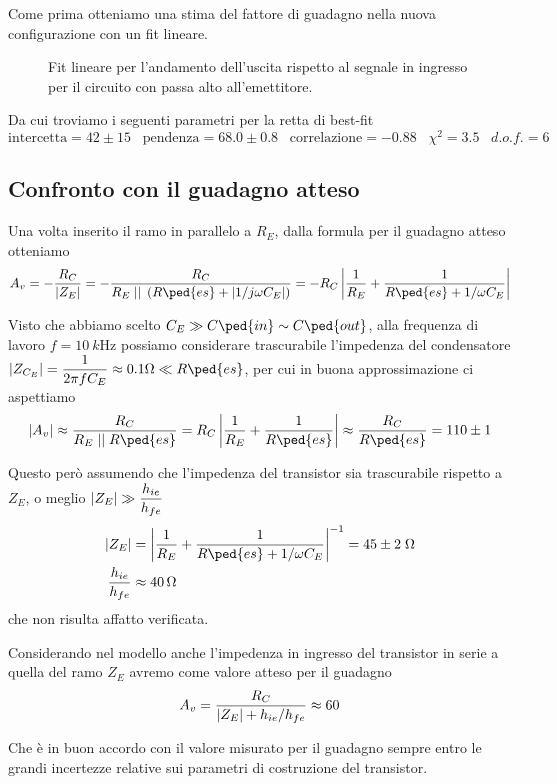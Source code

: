 \documentclass[10pt,a4paper]{article}
\begin{document}
Come prima otteniamo una stima del fattore di guadagno nella nuova
configurazione con un fit lineare.
\begin{figure}[htb]
\centering
\caption{Fit lineare per l'andamento dell'uscita rispetto al segnale in
ingresso per il circuito con passa alto all'emettitore.
\label{fig: gainCEfit}}
\end{figure}

Da cui troviamo i seguenti parametri per la retta di best-fit
\[
\mathrm{intercetta} = 42 \pm 15 \;\;\;\mathrm{pendenza} = 68.0 \pm 0.8 \;\;\;\mathrm{correlazione} 
= -0.88 \;\;\; \chi^2 = 3.5 \;\;\; d.o.f. = 6
\]

\subsection{Confronto con il guadagno atteso}
Una volta inserito il ramo in parallelo a $R_E$, dalla formula per il guadagno
atteso otteniamo
\[
A_v = -\frac{R_C}{\abs{Z_E}} =
- \frac{R_C}{R_E \; \lvert \rvert \; \left(R\ped{es} + \abs{1/j\omega C_E}
\right)} =
- R_C \abs{\frac{1}{R_E} + \frac{1}{R\ped{es} + 1/\omega C_E}}
\]

Visto che abbiamo scelto $C_E \gg C\ped{in} \sim C\ped{out}$, alla frequenza
di lavoro $f = \SI{10}{k\Hz}$ possiamo considerare trascurabile l'impedenza
del condensatore $\abs{Z_{C_E}} = \dfrac{1}{2\pi f C_E} \approx 0.1 \si{\ohm}
\ll R\ped{es}$, per cui in buona approssimazione ci aspettiamo
\[
\abs{A_v} \approx
\frac{R_C}{R_E \; \lvert \rvert \; R\ped{es}} =
R_C \abs{\frac{1}{R_E} + \frac{1}{R\ped{es}}} \approx
\frac{R_C}{R\ped{es}} = 110 \pm 1
\]

Questo però assumendo che l'impedenza del transistor sia trascurabile rispetto
a $Z_E$, o meglio $\left| Z_E \right| \gg \dfrac{h_{ie}}{h_{fe}}$
\begin{align*}
\abs{Z_E} &= \abs{\frac{1}{R_E} + \frac{1}{R\ped{es} + 1/\omega C_E}}^{-1} =
45 \pm 2 \; \si{\ohm} \\
\frac{h_{ie}}{h_{fe}} &\approx \SI{40}{\ohm}
\end{align*}
che non risulta affatto verificata.

Considerando nel modello anche l'impedenza in ingresso del transistor in
serie a quella del ramo $Z_E$ avremo come valore atteso per il guadagno
\begin{equation}
A_v = \frac{R_C}{\left| Z_E \right| + h_{ie}/h_{fe}} \approx 60
\end{equation}

Che è in buon accordo con il valore misurato per il guadagno sempre
entro le grandi incertezze relative sui parametri di costruzione del
transistor.
\end{document}
